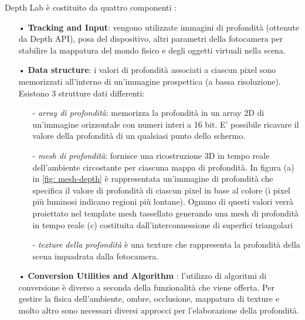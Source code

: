 \documentclass[crop=false, class=book]{standalone}
\begin{document}
		\begin{flushleft}
			Depth Lab è costituito da quattro componenti \cite{ruofeidu2020depthlab}:
		\end{flushleft}
		
		\begin{itemize}
			\item[•] \textbf{ Tracking and Input}: vengono utilizzate immagini di profondità (ottenute da Depth API), posa del dispositivo, altri parametri della fotocamera per stabilire la mappatura del mondo fisico e degli oggetti virtuali nella scena.
			\item[•] \textbf{Data structure}: i valori di profondità associati a ciascun pixel sono memorizzati all'interno di un'immagine prospettica (a bassa risoluzione).\\
			 Esistono 3 strutture dati differenti:
			\begin{itemize}
				\item[-] \emph{array di profondità}: memorizza la profondità in un array 2D di un'immagine orizzontale con numeri interi a 16 bit. E' possibile ricavare il valore della profondità di un qualsiasi punto dello schermo.
				\item[-] \emph{mesh di profondità}: fornisce una ricostruzione 3D in tempo reale dell'ambiente circostante per ciascuna mappa di profondità. In figura (a) in \vref{fig: mesh-depth} è rappresentata un'immagine di profondità che specifica il valore di profondità di ciascun pixel in base al colore (i pixel più luminosi indicano regioni più lontane). Ognuno di questi valori verrà proiettato nel template mesh tassellato generando una mesh di profondità in tempo reale (c) costituita dall'interconnessione di superfici triangolari  
				\item[-] \emph{texture della profondità} è una texture che rappresenta la profondità della scena inquadrata dalla fotocamera.
			\end{itemize}
			\item[•] \textbf{Conversion Utilities and Algorithm }: l'utilizzo di algoritmi di conversione è diverso a seconda della funzionalità che viene offerta. Per gestire la fisica dell'ambiente, ombre, occlusione, mappatura di texture e molto altro sono necessari diversi approcci per l'elaborazione della profondità.
			

\end{itemize}
\end{document}
